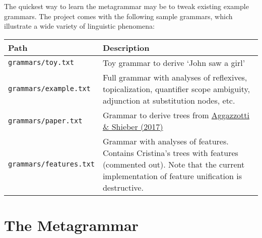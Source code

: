 \documentclass[10.5pt]{article}
\newcommand{\code}[1]{\texttt{#1}}
\begin{document}
The quickest way to learn the metagrammar may be to tweak existing example grammars. The project comes with the following sample grammars, which illustrate a wide variety of linguistic phenomena:
\renewcommand{\arraystretch}{1.5}
\begin{table}[!ht]
  \centering
  \begin{tabular}{|l|p{}|}
    \hline
    \textbf{Path} & \textbf{Description} \\ \hline
    \code{grammars/toy.txt} & Toy grammar to derive `John saw a girl' \\ \hline
    \code{grammars/example.txt} & Full grammar with analyses of reflexives, topicalization, quantifier scope ambiguity, adjunction at substitution nodes, etc. \\ \hline
    \code{grammars/paper.txt} & Grammar to derive trees from \href{http://aclweb.org/anthology/W/W17/W17-6204.pdf}{Aggazzotti \& Shieber (2017)} \\ \hline
    \code{grammars/features.txt} & Grammar with analyses of features. Contains Cristina's trees with features (commented out). Note that the current implementation of feature unification is destructive. \\
    \hline
  \end{tabular}
  \label{table:grammars}
\end{table}


\section{The Metagrammar} \label{sec:metagrammar}
\end{document}
